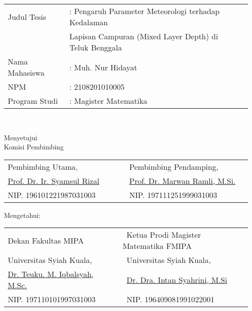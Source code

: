 \setcounter{page}{2}
\vspace{1.5pc}

\begin{center}
	\normalsize
	\noindent
	\begin{tabular}{l l l}
		Judul Tesis \verb"  " &: Pengaruh Parameter Meteorologi terhadap Kedalaman \\
		& Lapisan Campuran (Mixed Layer Depth) di Teluk Benggala  \\
		Nama Mahasiswa &: Muh. Nur Hidayat \\
		NPM &: 2108201010005 \\
		Program Studi	&: Magister Matematika \\ 
	\end{tabular} \\
\end{center}

\begin{center}
	\vspace{4cm}
	Menyetujui\\
	Komisi Pembimbing
	
	\vspace{1cm}
	
	\begin{tabular}{l l }
		Pembimbing Utama,\verb"                 " & Pembimbing Pendamping, \verb"            "\\[2.25cm]
		\underline{Prof. Dr. Ir. Syamsul Rizal} & \underline{Prof. Dr. Marwan Ramli, M.Si.}\\
		NIP. 196101221987031003 & NIP. 197111251999031003
	\end{tabular}
\end{center}

\begin{center}
	\vspace{0.5cm}
	Mengetahui:\\%
	
	\vspace{1cm}
	
	\begin{tabular}{l l }
		Dekan Fakultas MIPA\verb"             " & \verb" "Ketua Prodi Magister Matematika FMIPA\\
		Universitas Syiah Kuala, & \verb" "Universitas Syiah Kuala,\\[2.25cm]
		\underline{Dr. Teuku. M. Iqbalsyah, M.Sc.} & \verb" "\underline{Dr. Dra. Intan Syahrini, M.Si}\\
		NIP. 197110101997031003 & \verb" "NIP. 196409081991022001
	\end{tabular}
\end{center}
\vspace{0.3cm}
\begin{center}
	
\end{center}
\thispagestyle{empty}
